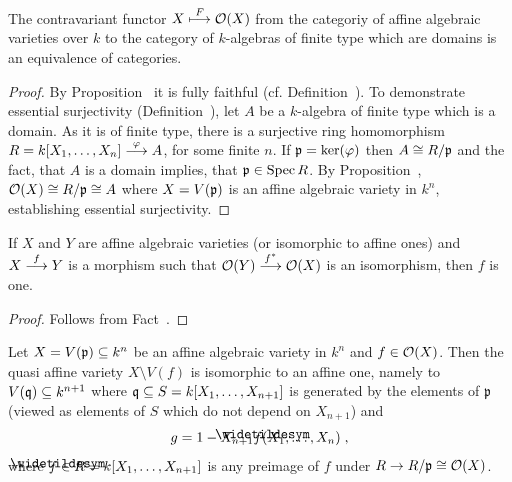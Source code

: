 \documentclass[a4paper,parskip=half,numbers=enddot, DIV=12]{scrreprt}
\begin{document}
	\begin{cor}
		The contravariant functor $X\overset{F}{\longmapsto} \mathcal{O}(X)$ from the categoriy of affine algebraic varieties over $k$ to the category of $k$-algebras of finite type which are domains is an equivalence of categories.
	\end{cor}
	\begin{proof}
	 	By Proposition~ it is fully faithful (cf. Definition~). To demonstrate essential surjectivity (Definition~), let $A$ be a $k$-algebra of finite type which is a domain. As it is of finite type, there is a surjective ring homomorphism $R=k[X_1,\ldots, X_n]\morphism[\phi] A$, for some finite $n$. If $\mathfrak{p} = \ker(\varphi)$ then $A\cong R/\mathfrak{p}$ and the fact, that $A$ is a domain implies, that $\mathfrak{p}\in\operatorname{Spec} R$. By Proposition~, $\mathcal{O}(X)\cong R/\mathfrak{p} \cong A$ where $X=V(\mathfrak{p})$ is an affine algebraic variety in $k^n$, establishing essential surjectivity.
	\end{proof}
	\begin{cor}
		If $X$ and $Y$ are affine algebraic varieties (or isomorphic to affine ones) and $X\morphism[f] Y$ is a morphism such that $\Oo(Y) \morphism[f^*] \Oo(X)$ is an isomorphism, then $f$ is one.
	\end{cor}
	\begin{proof}
		Follows from Fact~.
	\end{proof}
	\begin{prop}
		Let $X= V(\mathfrak{p})\subseteq k^n$ be an affine algebraic variety in $k^n$ and $f\in \mathcal{O}(X)$. Then the quasi affine variety $X\setminus V(f)$ is isomorphic to an affine one, namely to $V(\mathfrak{q})\subseteq k^{n+1}$ where $\mathfrak{q}\subseteq S=k[X_1,\ldots, X_{n+1}]$ is generated by the elements of $\mathfrak{p}$ (viewed as elements of $S$ which do not depend on $X_{n+1}$) and
		\begin{align*}
			g= 1 - X_{n+1}\snake f(X_1,\ldots, X_n)\;,
		\end{align*}
		where $\snake f  \in R =k[X_1,\ldots,X_{n+1}]$ is any preimage of $f$ under $R\to R/\mathfrak{p} \cong \mathcal{O}(X)$. 
	\end{prop}
\end{document}
